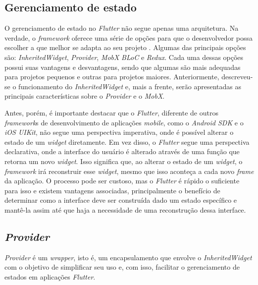 \subsection{Gerenciamento de estado}
\label{cap2:Subsec:GerenciamentoEstado}
O gerenciamento de estado no \textit{Flutter} não segue apenas uma arquitetura. Na verdade, o \textit{framework} oferece uma série de opções para que o desenvolvedor possa escolher a que melhor se adapta ao seu projeto \cite{Faust2020}. Algumas das principais opções são: \textit{InheritedWidget}, \textit{Provider}, \textit{MobX} \textit{BLoC} e \textit{Redux}. Cada uma dessas opções possui suas vantagens e desvantagens, sendo que algumas são mais adequadas para projetos pequenos e outras para projetos maiores. Anteriormente, descreveu-se o funcionamento do \textit{InheritedWidget} e, mais a frente, serão apresentadas as principais características sobre o \textit{Provider} e o \textit{MobX}.

Antes, porém, é importante destacar que o \textit{Flutter}, diferente de outros \textit{framework}s de desenvolvimento de aplicações \textit{mobile}, como o \textit{Android SDK} e o \textit{iOS UIKit}, não segue uma perspectiva imperativa, onde é possível alterar o estado de um \textit{widget} diretamente. Em vez disso, o \textit{Flutter} segue uma perspectiva declarativa, onde a interface do usuário é alterado através de uma função que retorna um novo \textit{widget}. Isso significa que, ao alterar o estado de um \textit{widget}, o \textit{framework} irá reconstruir esse \textit{widget}, mesmo que isso aconteça a cada novo \textit{frame} da aplicação. O processo pode ser custoso, mas o \textit{Flutter} é rápido o suficiente para isso e existem vantagens associadas, principalmente o benefício de determinar como a interface deve ser construída dado um estado específico e mantê-la assim até que haja a necessidade de uma reconstrução dessa interface.

\subsection{\textit{Provider}}
\label{cap2:Subsec:Provider}

\textit{Provider} é um \textit{wrapper}, isto é, um encapsulamento que envolve o \textit{InheritedWidget} com o objetivo de simplificar seu uso e, com isso, facilitar o gerenciamento de estados em aplicações \textit{Flutter}.

